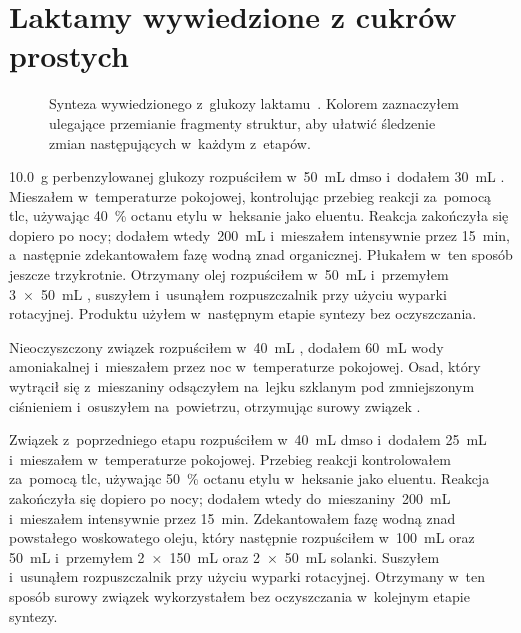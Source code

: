 \pagebreak
\section{Laktamy wywiedzione z cukrów prostych}\label{experimental:lactams}
\begin{figure}
  
  \caption{
    Synteza wywiedzionego z~glukozy laktamu~.
    Kolorem zaznaczyłem ulegające przemianie fragmenty struktur,
      aby ułatwić śledzenie zmian następujących w~każdym z~etapów.
  } \label{sch:gluco-synthesis}
\end{figure}
\SI{10.0}{\gram} perbenzylowanej glukozy rozpuściłem w~\SI{50}{\mL} \gls{dmso}
  i~dodałem \SI{30}{\mL} .
Mieszałem w~temperaturze pokojowej, kontrolując przebieg reakcji za~pomocą \gls{tlc},
  używając \SI{40}{\percent} octanu etylu w~heksanie jako eluentu.
Reakcja zakończyła się dopiero po nocy; dodałem wtedy~\SI{200}{\mL}  i~mieszałem
  intensywnie przez \SI{15}{\minute}, a~następnie zdekantowałem fazę wodną znad organicznej.
Płukałem w~ten sposób jeszcze trzykrotnie.
Otrzymany olej rozpuściłem w~\SI{50}{\mL}  i~przemyłem 
  \SI[product-units = single]{3 x 50}{\mL} , suszyłem  i~usunąłem rozpuszczalnik
  przy użyciu wyparki rotacyjnej.
Produktu użyłem w~następnym etapie syntezy bez oczyszczania.

Nieoczyszczony związek  rozpuściłem w~\SI{40}{\mL} ,
  dodałem \SI{60}{\mL} wody amoniakalnej i~mieszałem przez noc w~temperaturze pokojowej.
Osad, który wytrącił się z~mieszaniny odsączyłem na~lejku szklanym pod zmniejszonym ciśnieniem
  i~osuszyłem na~powietrzu, otrzymując surowy związek .

Związek  z~poprzedniego etapu rozpuściłem w~\SI{40}{\mL} \gls{dmso}
  i~dodałem \SI{25}{\mL}  i~mieszałem w~temperaturze pokojowej.
Przebieg reakcji kontrolowałem za~pomocą \gls{tlc},
  używając \SI{50}{\percent} octanu etylu w~heksanie jako eluentu.
Reakcja zakończyła się dopiero po nocy; dodałem wtedy do~mieszaniny~\SI{200}{\mL} 
  i~mieszałem intensywnie przez \SI{15}{\minute}.
Zdekantowałem fazę wodną znad powstałego woskowatego oleju, który następnie rozpuściłem
  w~\SI{100}{\mL}  oraz \SI{50}{\mL}  i~przemyłem
  \SI[product-units = single]{2 x 150}{\mL}  oraz
  \SI[product-units = single]{2 x 50}{\mL} solanki.
Suszyłem  i~usunąłem rozpuszczalnik przy użyciu wyparki rotacyjnej.
Otrzymany w~ten sposób surowy związek  wykorzystałem bez oczyszczania
  w~kolejnym etapie syntezy.

